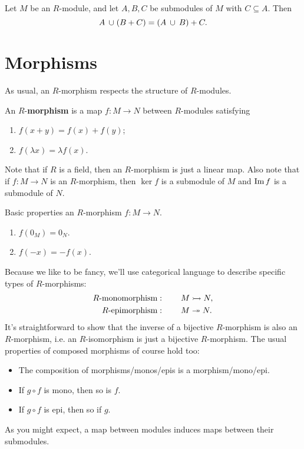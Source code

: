 \documentclass[twoside,10pt]{report}
\begin{document}
\begin{thrm}
Let $M$ be an $R$-module, and let $A,B,C$ be submodules of $M$ with $C \subseteq A$. Then
\[
	A \operatorname{\;\cup\;} (B+C) = (A\operatorname{\;\cup\;} B) + C.
\] 
\end{thrm}

\section{Morphisms}

As usual, an $R$-morphism respects the structure of $R$-modules.
\begin{defn}[]
An $R$-\textbf{morphism} is a map $f:M\to N$ between $R$-modules satisfying
\begin{enumerate}
	\item $f(x+y) = f(x) + f(y)$;
	\item $f(\lambda x) = \lambda f(x)$.
\end{enumerate}
\end{defn}

Note that if $R$ is a field, then an $R$-morphism is just a linear map. Also note that if $f:M\to N$ is an $R$-morphism, then $\ker f$ is a submodule of $M$ and $\operatorname{Im} f$ is a submodule of $N$.

\begin{prop}
Basic properties an $R$-morphism $f:M\to N$.
\begin{enumerate}
	\item $f(0_{M})=0_{N}$.
	\item $f(-x)=-f(x)$.
\end{enumerate}
\end{prop}
Because we like to be fancy, we'll use categorical language to describe specific types of $R$-morphisms:
\begin{align*}
	R\text{-monomorphism}&: \quad\quad M \rightarrowtail N,\\
	R\text{-epimorphism}&: \quad\quad M \twoheadrightarrow N.
\end{align*}
It's straightforward to show that the inverse of a bijective $R$-morphism is also an $R$-morphism, i.e. an $R$-isomorphism is just a bijective $R$-morphism. The usual properties of composed morphisms of course hold too:
\begin{itemize}
	\item The composition of morphisms/monos/epis is a morphism/mono/epi.
	\item If $g \circ f$ is mono, then so is $f$.
	\item If $g \circ f$ is epi, then so if $g$.
\end{itemize}
As you might expect, a map between modules induces maps between their submodules.
\end{document}
